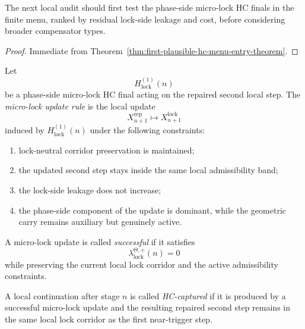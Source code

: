 \begin{corollary}
\label{cor:current-hc-entry-working-rule}
The next local audit should first test the phase-side micro-lock HC finals in the finite menu, ranked by residual lock-side leakage and cost, before considering broader compensator types.
\end{corollary}

\begin{proof}
Immediate from Theorem~\ref{thm:first-plausible-hc-menu-entry-theorem}.
\end{proof}



\begin{definition}
\label{def:micro-lock-update-rule}
Let
\[
 H_{\mathrm{lock}}^{(1)}(n)
\]
be a phase-side micro-lock HC final acting on the repaired second local step. The \emph{micro-lock update rule} is the local update
\[
 X_{n+1}^{\mathrm{rep}}
 \longmapsto
 X_{n+1}^{\mathrm{lock}}
\]
induced by $H_{\mathrm{lock}}^{(1)}(n)$ under the following constraints:
\begin{enumerate}[leftmargin=2em,label=(\alph*)]
 \item lock-neutral corridor preservation is maintained;
 \item the updated second step stays inside the same local admissibility band;
 \item the lock-side leakage does not increase;
 \item the phase-side component of the update is dominant, while the geometric carry remains auxiliary but genuinely active.
\end{enumerate}
\end{definition}

\begin{definition}
\label{def:successful-micro-lock-update}
A micro-lock update is called \emph{successful} if it satisfies
\[
 \lambda_{\mathrm{lock}}^{\Theta,+}(n)=0
\]
while preserving the current local lock corridor and the active admissibility constraints.
\end{definition}

\begin{definition}
\label{def:hc-captured-local-continuation}
A local continuation after stage $n$ is called \emph{HC-captured} if it is produced by a successful micro-lock update and the resulting repaired second step remains in the same local lock corridor as the first near-trigger step.
\end{definition}


